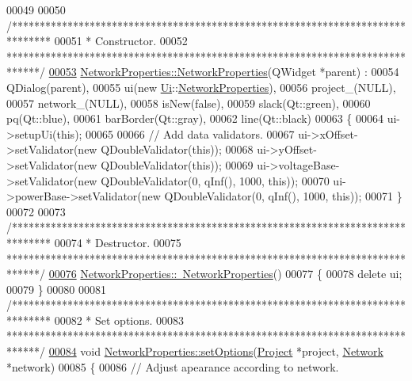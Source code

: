 \begin{DoxyCode}
00049 
00050 \textcolor{comment}{/*******************************************************************************}
00051 \textcolor{comment}{ * Constructor.}
00052 \textcolor{comment}{ ******************************************************************************/}
\hypertarget{networkproperties_8cpp_source_l00053}{}\hyperlink{group___window_ga3d9dac6454f6e722360d9d77af85e4ce}{00053} \hyperlink{group___window_ga3d9dac6454f6e722360d9d77af85e4ce}{NetworkProperties::NetworkProperties}(QWidget *parent) :
00054   QDialog(parent),
00055   ui(new \hyperlink{namespace_ui}{Ui}::\hyperlink{class_network_properties}{NetworkProperties}),
00056   project\_(NULL),
00057   network\_(NULL),
00058   isNew(false),
00059   slack(Qt::green),
00060   pq(Qt::blue),
00061   barBorder(Qt::gray),
00062   line(Qt::black)
00063 \{
00064   ui->setupUi(\textcolor{keyword}{this});
00065 
00066   \textcolor{comment}{// Add data validators.}
00067   ui->xOffset->setValidator(\textcolor{keyword}{new} QDoubleValidator(\textcolor{keyword}{this}));
00068   ui->yOffset->setValidator(\textcolor{keyword}{new} QDoubleValidator(\textcolor{keyword}{this}));
00069   ui->voltageBase->setValidator(\textcolor{keyword}{new} QDoubleValidator(0, qInf(), 1000, \textcolor{keyword}{this}));
00070   ui->powerBase->setValidator(\textcolor{keyword}{new} QDoubleValidator(0, qInf(), 1000, \textcolor{keyword}{this}));
00071 \}
00072 
00073 \textcolor{comment}{/*******************************************************************************}
00074 \textcolor{comment}{ * Destructor.}
00075 \textcolor{comment}{ ******************************************************************************/}
\hypertarget{networkproperties_8cpp_source_l00076}{}\hyperlink{group___window_ga097b617788eebe80236c0041f8293422}{00076} \hyperlink{group___window_ga097b617788eebe80236c0041f8293422}{NetworkProperties::~NetworkProperties}()
00077 \{
00078   \textcolor{keyword}{delete} ui;
00079 \}
00080 
00081 \textcolor{comment}{/*******************************************************************************}
00082 \textcolor{comment}{ * Set options.}
00083 \textcolor{comment}{ ******************************************************************************/}
\hypertarget{networkproperties_8cpp_source_l00084}{}\hyperlink{group___window_ga9dd17216f65e1c35012699e13547d984}{00084} \textcolor{keywordtype}{void} \hyperlink{group___window_ga9dd17216f65e1c35012699e13547d984}{NetworkProperties::setOptions}(\hyperlink{class_project}{Project} *project, 
      \hyperlink{class_network}{Network} *network)
00085 \{
00086 \textcolor{comment}{// Adjust apearance according to network.}

\end{DoxyCode}
